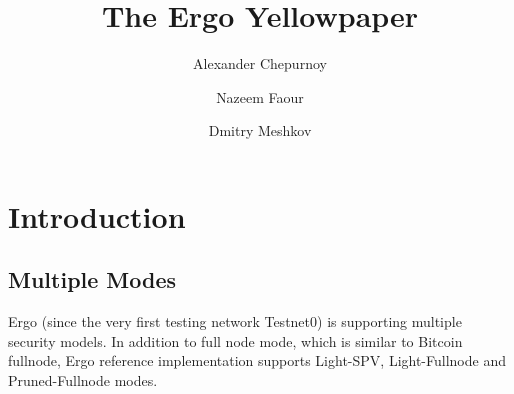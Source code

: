\documentclass[]{article}   %
\newcommand{\ergo}{Ergo}
\begin{document}
\title{The \ergo{} Yellowpaper}
\author{Alexander Chepurnoy \and Nazeem Faour \and Dmitry Meshkov}
\maketitle

\newpage
\tableofcontents

\section{Introduction}
\subsection{Multiple Modes}
Ergo (since the very first testing network Testnet0) is supporting multiple security models. In addition to full node
mode, which is similar to Bitcoin fullnode, Ergo reference implementation supports Light-SPV, Light-Fullnode and Pruned-Fullnode modes.
\end{document}
